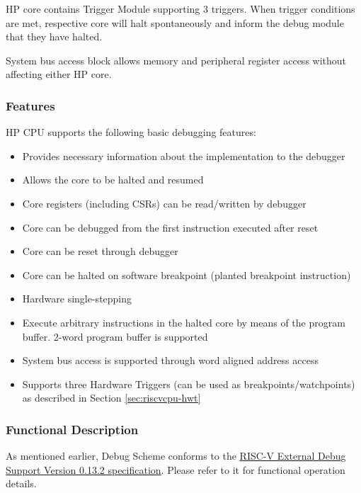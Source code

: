 \documentclass[main\_\_EN.tex]{subfiles}
\begin{document}
HP core contains Trigger Module supporting 3 triggers. When trigger conditions are met, respective core will halt spontaneously and inform the debug module that they have halted.

System bus access block allows memory and peripheral register access without affecting either HP core.


\subsubsection{Features}
\label{sec:riscvcpu-dbg-features}

HP CPU supports the following basic debugging features:

\begin{itemize}
    \item Provides necessary information about the implementation to the debugger
    \item Allows the core to be halted and resumed
    \item Core registers (including CSRs) can be read/written by debugger
    \item Core can be debugged from the first instruction executed after reset
    \item Core can be reset through debugger
    \item Core can be halted on software breakpoint (planted breakpoint instruction)
    \item Hardware single-stepping
    \item Execute arbitrary instructions in the halted core by means of the program buffer. 2-word program buffer is supported
    \item System bus access is supported through word aligned address access
    \item Supports three Hardware Triggers (can be used as breakpoints/watchpoints) as described in Section \ref{sec:riscvcpu-hwt}
\end{itemize}

\subsubsection{Functional Description}
\label{sec:riscvcpu-dbg-func-descr}

As mentioned earlier, Debug Scheme conforms to the \href{https://riscv.org/wp-content/uploads/2019/03/riscv-debug-release.pdf} {RISC-V External Debug Support Version 0.13.2 specification}. Please refer to it for functional operation details.
\end{document}
